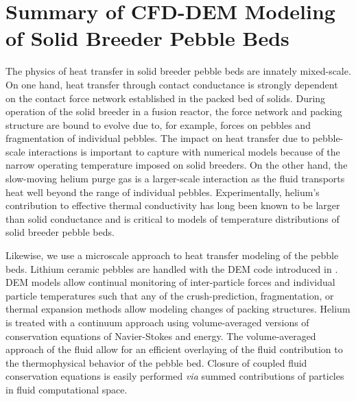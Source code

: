 \FloatBarrier



%
%
\section{Summary of CFD-DEM Modeling of Solid Breeder Pebble Beds}
The physics of heat transfer in solid breeder pebble beds are innately mixed-scale. On one hand, heat transfer through contact conductance is strongly dependent on the contact force network established in the packed bed of solids. During operation of the solid breeder in a fusion reactor, the force network and packing structure are bound to evolve due to, for example, forces on pebbles and fragmentation of individual pebbles. The impact on heat transfer due to pebble-scale interactions is important to capture with numerical models because of the narrow operating temperature imposed on solid breeders. On the other hand, the slow-moving helium purge gas is a larger-scale interaction as the fluid transports heat well beyond the range of individual pebbles. Experimentally, helium's contribution to effective thermal conductivity has long been known to be larger than solid conductance and is critical to models of temperature distributions of solid breeder pebble beds.

Likewise, we use a microscale approach to heat transfer modeling of the pebble beds. Lithium ceramic pebbles are handled with the DEM code introduced in . DEM models allow continual monitoring of inter-particle forces and individual particle temperatures such that any of the crush-prediction, fragmentation, or thermal expansion methods allow modeling changes of packing structures. Helium is treated with a continuum approach using volume-averaged versions of conservation equations of Navier-Stokes and energy. The volume-averaged approach of the fluid allow for an efficient overlaying of the fluid contribution to the thermophysical behavior of the pebble bed. Closure of coupled fluid conservation equations is easily performed \textit{via} summed contributions of particles in fluid computational space. 


